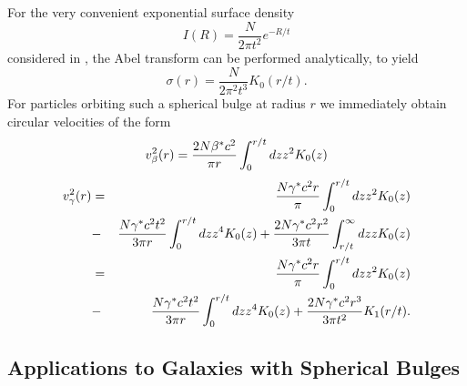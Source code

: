 \documentclass[preprint,aps]{revtex4}
\begin{document}
For the very convenient exponential surface density
%
\begin{equation}
I(R)=\frac{N}{2\pi t^2}e^{-R/t}
\label{B5}
\end{equation}
% 
considered in \cite{Andredakis1994}, the Abel transform can be performed analytically, to yield
%
\begin{equation}
\sigma(r)=\frac{N}{2\pi^2 t^3}K_0(r/t).
\label{B6}
\end{equation}
% 
For particles orbiting such a spherical bulge at radius $r$ we immediately obtain circular velocities of the form
% 
\begin{equation}
v^2_{\beta}(r)={2 N\beta^* c^2\over \pi r} \int_0^{r/t}dz z^2K_0(z)
\label{B7}
\end{equation} 
% 
% 
\begin{eqnarray}
v^2_{\gamma}(r)&=&{N\gamma^* c^2 r\over \pi} \int_0^{r/t}dz z^2K_0(z)
\nonumber\\
&-&{ N\gamma^* c^2 t^2 \over 3 \pi r} \int_0^{r/t}dz z^4K_0(z)
+{2 N\gamma^* c^2 r^2 \over 3\pi t}\int_{r/t}^{\infty}dz zK_0(z)
\nonumber\\
&=&{N\gamma^* c^2 r\over \pi} \int_0^{r/t}dz z^2K_0(z)
\nonumber\\
&-&{ N\gamma^* c^2 t^2 \over 3 \pi r} \int_0^{r/t}dz z^4K_0(z)
+{2 N\gamma^* c^2 r^3 \over 3\pi t^2}K_1(r/t).
\label{B8}
\end{eqnarray} 
%

\subsection{Applications to Galaxies with Spherical Bulges}
\end{document}
